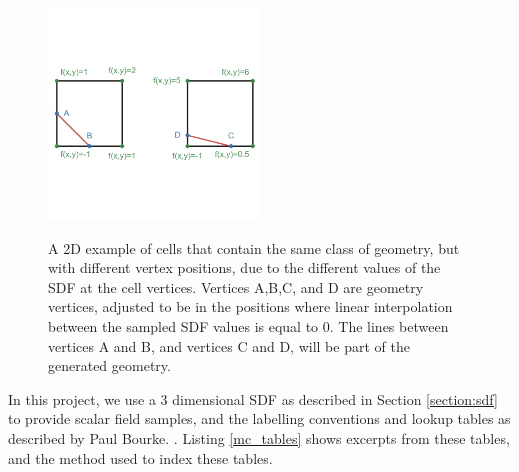 \documentclass{article}
\begin{document}
\begin{figure}
  \caption{A 2D example of cells that contain the same class of geometry, but with different vertex positions, due to the different values of the SDF at the cell vertices. Vertices A,B,C, and D are geometry vertices, adjusted to be in the positions where linear interpolation between the sampled SDF values is equal to 0. The lines between vertices A and B, and vertices C and D, will be part of the generated geometry.}
  \includegraphics[width=0.5\textwidth]{linear_interpolation.png}
  \label{fig:linear_interpolation}
\end{figure}

In this project, we use a 3 dimensional SDF as described in Section \ref{section:sdf} to provide scalar field samples, and the labelling conventions and lookup tables as described by Paul Bourke. \cite{bourke_1994}. Listing \ref{mc_tables} shows excerpts from these tables, and the method used to index these tables.
\end{document}

